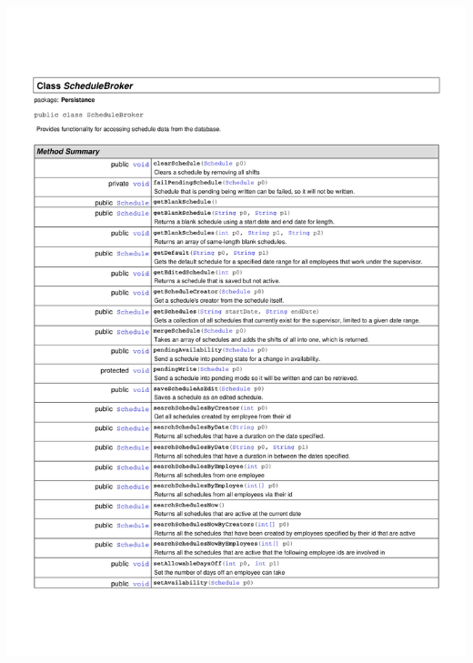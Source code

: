 \documentclass[letterpaper,12pt]{report}
\begin{document}
\includegraphics[scale=0.9,trim=20mm 30mm 25mm 25mm]{externals/PersistanceDataDictionary4.pdf}
\newpage
\end{document}
